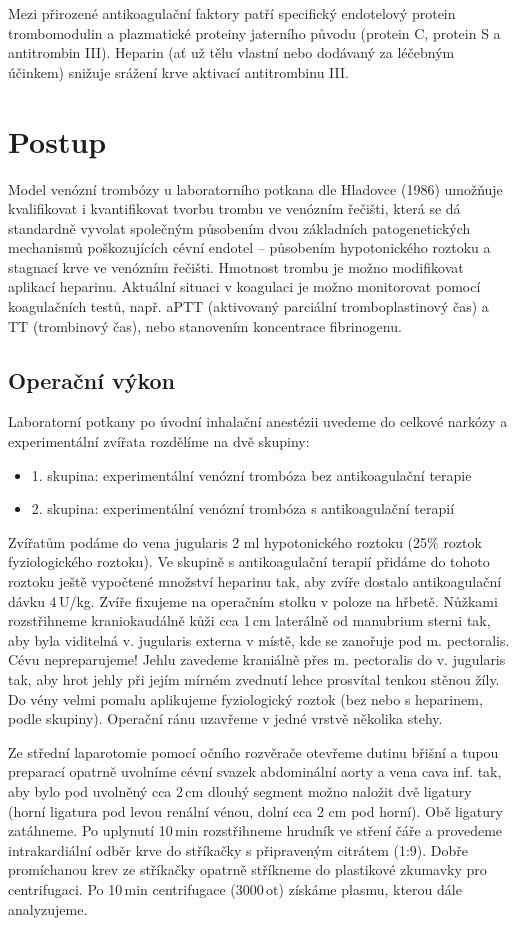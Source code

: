\documentclass[12pt]{article}
\begin{document}
Mezi přirozené antikoagulační faktory patří specifický endotelový protein trombomodulin a
plazmatické proteiny jaterního původu (protein C, protein S a antitrombin III). Heparin (ať už
tělu vlastní nebo dodávaný za léčebným účinkem) snižuje srážení krve aktivací antitrombinu III.


\section{Postup}
Model venózní trombózy u laboratorního potkana dle Hladovce (1986) umožňuje kvalifikovat i
kvantifikovat tvorbu trombu ve venózním řečišti, která se dá standardně vyvolat společným
působením dvou základních patogenetických mechanismů poškozujících cévní endotel –
působením hypotonického roztoku a stagnací krve ve venózním řečišti. Hmotnost trombu je
možno modifikovat aplikací heparinu. Aktuální situaci v koagulaci je možno monitorovat pomocí
koagulačních testů, např. aPTT (aktivovaný parciální tromboplastinový čas) a TT (trombinový
čas), nebo stanovením koncentrace fibrinogenu.
\subsection{Operační výkon}
Laboratorní potkany po úvodní inhalační anestézii uvedeme do celkové narkózy a 
experimentální zvířata rozdělíme na dvě skupiny:
\begin{itemize}
	\item{1. skupina: experimentální venózní trombóza bez antikoagulační terapie}
	\item{2. skupina: experimentální venózní trombóza s antikoagulační terapií}
\end{itemize}
Zvířatům podáme do vena jugularis 2 ml hypotonického roztoku (25\% roztok fyziologického
roztoku). Ve skupině s antikoagulační terapií přidáme do tohoto roztoku ještě vypočtené
množství heparinu tak, aby zvíře dostalo antikoagulační dávku 4\,U/kg. Zvíře fixujeme na
operačním stolku v poloze na hřbetě. Nůžkami rozstřihneme kraniokaudálně kůži cca 1\,cm
laterálně od manubrium sterni tak, aby byla viditelná v. jugularis externa v místě, kde se zanořuje
pod m. pectoralis. Cévu nepreparujeme! Jehlu zavedeme kraniálně přes m. pectoralis do v.
jugularis tak, aby hrot jehly při jejím mírném zvednutí lehce prosvítal tenkou stěnou žíly. Do
vény velmi pomalu aplikujeme fyziologický roztok (bez nebo s heparinem, podle skupiny).
Operační ránu uzavřeme v jedné vrstvě několika stehy.

Ze střední laparotomie pomocí očního rozvěrače otevřeme dutinu břišní a tupou preparací opatrně
uvolníme cévní svazek abdominální aorty a vena cava inf. tak, aby bylo pod uvolněný cca 2\,cm
dlouhý segment možno naložit dvě ligatury (horní ligatura pod levou renální vénou, dolní cca 2
cm pod horní). Obě ligatury zatáhneme. Po uplynutí 10\,min rozstřihneme hrudník ve stření čáře a
provedeme intrakardiální odběr krve do stříkačky s připraveným citrátem (1:9). Dobře
promíchanou krev ze stříkačky opatrně stříkneme do plastikové zkumavky pro centrifugaci. Po
10\,min centrifugace (3000\,ot) získáme plasmu, kterou dále analyzujeme.
\end{document}
